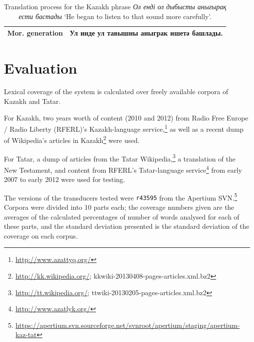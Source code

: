 \documentclass[a4paper,11pt]{article}
\newcommand{\tag}[1]{{\small{\texttt{#1}}}}
\newcommand{\eng}[1]{`#1'}
\begin{document}
\begin{table}[htbp]
\begin{tabular}{ll}
\midrule
{\bf Mor. generation} & Ул инде ул тавышны аныграк ишетә башлады. \\
\bottomrule
\end{tabular}
 \caption{Translation process for the Kazakh phrase \emph{Ол енді ол дыбысты анығырақ ести бастады} \eng{He began to listen to that sound more carefully}.}
 \label{tab:pipeline}
\end{table}

\section{Evaluation}
\label{sec:eval}

Lexical coverage of the system is calculated over freely available corpora of Kazakh and Tatar.

For Kazakh, two years worth of content (2010 and 2012) from Radio Free Europe / Radio Liberty (RFERL)'s Kazakh-language service,\footnote{\url{http://www.azattyq.org/}} as well as a recent dump of Wikipedia's articles in Kazakh\footnote{\url{http://kk.wikipedia.org/}; {\smallertt kkwiki-20130408-pages-articles.xml.bz2}} were used.

For Tatar, a dump of articles from the Tatar Wikipedia,\footnote{\url{http://tt.wikipedia.org/}; {\smallertt ttwiki-20130205-pages-articles.xml.bz2}} a translation of the New Testament, and content from RFERL's Tatar-language service\footnote{\url{http://www.azatlyk.org/}} from early 2007 to early 2012 were used for testing.

The versions of the transducers tested were {\tt {\small r43595}} from the Apertium SVN.\footnote{\url{https://apertium.svn.sourceforge.net/svnroot/apertium/staging/apertium-kaz-tat}}  Corpora were divided into 10 parts each; the coverage numbers given are the averages of the calculated percentages of number of words analysed for each of these parts, and the standard deviation presented is the standard deviation of the coverage on each corpus.
\end{document}
